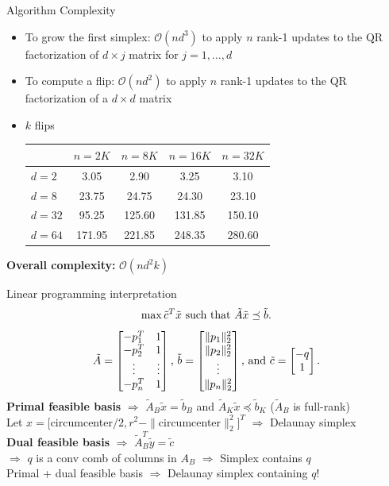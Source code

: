 \documentclass[xcolor=dvipsnames]{beamer}
\begin{document}
\begin{frame}{Algorithm Complexity}
\begin{itemize}
\item To grow the first simplex:
$\mathcal{O}(n d^3)$ to apply $n$ rank-1 updates to the QR factorization of
$d \times j$ matrix for $j=1,\ldots,d$
\item To compute a flip:
$\mathcal{O}(n d^2)$ to apply $n$ rank-1 updates to the QR factorization of
a $d \times d$ matrix
\item $k$ flips\\
\begin{tabular}{l|cccc}
  & $n=2K$ & $n=8K$ & $n=16K$ & $n=32K$\\
\hline
$d=2$  & 3.05 & 2.90 & 3.25 & 3.10\\
$d=8$  & 23.75 & 24.75 & 24.30 & 23.10\\
$d=32$ & 95.25 & 125.60 & 131.85 & 150.10\\
$d=64$ & 171.95 & 221.85 & 248.35 & 280.60\\
\end{tabular}
\end{itemize}
\medskip
\pause
{\bf Overall complexity:} $\mathcal{O}(nd^2 k)$
\end{frame}
\begin{frame}{Linear programming interpretation}
$$
\max {\tilde c}^T {\tilde x}
\hbox{ such that }
{\tilde A}{\tilde x} \preceq {\tilde b}.
$$
$$
{\tilde A} = \left[ \begin{matrix}
-p_1^T & 1 \cr
-p_2^T & 1 \cr
\vdots & \vdots \cr
-p_n^T & 1 \cr
\end{matrix}\right]\text{, }
{\tilde b} = \left[ \begin{matrix}
\| p_1 \|_2^2 \cr
\| p_2 \|_2^2 \cr
\vdots \cr
\| p_n \|_2^2 \cr
\end{matrix}\right]\text{, and }
{\tilde c} = \left[ \begin{matrix}
-q \cr
1 \cr
\end{matrix}\right].
$$
\medskip
\pause
{\bf Primal feasible basis}
$\Rightarrow$ ${\tilde A}_B {\tilde x} = {\tilde b}_B$
and ${\tilde A}_K {\tilde x} \preceq {\tilde b}_K$ (${\tilde A}_B$ is full-rank)\\
\pause
Let $x = [$circumcenter$/2, r^2 - \|$circumcenter$\|_2^2]^T$
$\Rightarrow$ Delaunay simplex\\
\medskip
\pause
{\bf Dual feasible basis}
$\Rightarrow$ ${\tilde A}_B^T {\tilde y} = {\tilde c}$\\
\pause
$\Rightarrow$ $q$ is a conv comb of columns in $A_B$
$\Rightarrow$ Simplex contains $q$\\
\medskip
\pause
Primal + dual feasible basis $\Rightarrow$ Delaunay simplex containing $q$!
\end{frame}
\end{document}
